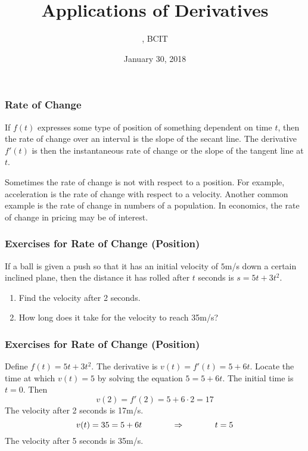 \documentclass[xcolor=dvipsnames]{beamer}
\title{Applications of Derivatives}
\subtitle{{\CourseNumber}, BCIT}
\author{\CourseName}
\date{January 30, 2018}
\begin{document}
\begin{frame}
  \titlepage
\end{frame}

\begin{frame}
  \frametitle{Rate of Change}
If $f(t)$ expresses some type of position of something dependent on
time $t$, then the rate of change over an interval is the slope of the
secant line. The derivative $f'(t)$ is then the instantaneous rate of
change or the slope of the tangent line at $t$. 

\bigskip

Sometimes the rate of change is not with respect to a position. For
example, acceleration is the rate of change with respect to a
velocity. Another common example is the rate of change in numbers of a
population. In economics, the rate of change in pricing may be of
interest.
\end{frame}

\begin{frame}
  \frametitle{Exercises for Rate of Change (Position)}
If a ball is given a push so that it has an initial velocity of $5$m/s
down a certain inclined plane, then the distance it has rolled after
$t$ seconds is $s=5t+3t^{2}$.
  \begin{enumerate}
  \item Find the velocity after 2 seconds.
  \item How long does it take for the velocity to reach 35m/s?
  \end{enumerate}
\end{frame}

\begin{frame}
  \frametitle{Exercises for Rate of Change (Position)}
Define $f(t)=5t+3t^{2}$. The derivative is $v(t)=f'(t)=5+6t$. Locate
the time at which $v(t)=5$ by solving the equation $5=5+6t$. The
initial time is $t=0$. Then
\begin{equation}
  \label{eq:airaiwie}
  v(2)=f'(2)=5+6\cdot{}2=17
\end{equation}
The velocity after 2 seconds is 17m/s.
\begin{equation}
  \label{eq:zeidieba}
  v(t)=35=5+6t\hspace{.5in}\Rightarrow\hspace{.5in}t=5
\end{equation}
The velocity after 5 seconds is 35m/s.
\end{frame}
\end{document}
